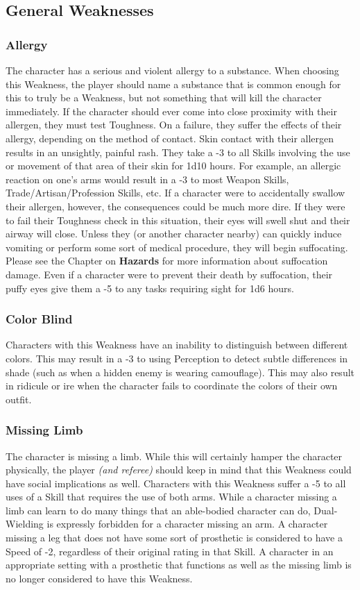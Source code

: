\documentclass[oneside]{book}
\begin{document}
\begin{multicols}{2}
\section{General Weaknesses}
\subsubsection{Allergy}
The character has a serious and violent allergy to a substance. When choosing this Weakness, the player should name a substance that is common enough for this to truly be a Weakness, but not something that will kill the character immediately. If the character should ever come into close proximity with their allergen, they must test Toughness. On a failure, they suffer the effects of their allergy, depending on the method of contact. Skin contact with their allergen results in an unsightly, painful rash. They take a -3 to all Skills involving the use or movement of that area of their skin for 1d10 hours. For example, an allergic reaction on one's arms would result in a -3 to most Weapon Skills, Trade/Artisan/Profession Skills, etc. If a character were to accidentally swallow their allergen, however, the consequences could be much more dire. If they were to fail their Toughness check in this situation, their eyes will swell shut and their airway will close. Unless they (or another character nearby) can quickly induce vomiting or perform some sort of medical procedure, they will begin suffocating. Please see the Chapter on \textbf{Hazards} for more information about suffocation damage. Even if a character were to prevent their death by suffocation, their puffy eyes give them a -5 to any tasks requiring sight for 1d6 hours.
\subsubsection{Color Blind}
Characters with this Weakness have an inability to distinguish between different colors. This may result in a -3 to using Perception to detect subtle differences in shade (such as when a hidden enemy is wearing camouflage). This may also result in ridicule or ire when the character fails to coordinate the colors of their own outfit. 
\subsubsection{Missing Limb}
The character is missing a limb. While this will certainly hamper the character physically, the player \emph{(and referee)} should keep in mind that this Weakness could have social implications as well. Characters with this Weakness suffer a -5 to all uses of a Skill that requires the use of both arms. While a character missing a limb can learn to do many things that an able-bodied character can do, Dual-Wielding is expressly forbidden for a character missing an arm. A character missing a leg that does not have some sort of prosthetic is considered to have a Speed of -2, regardless of their original rating in that Skill. A character in an appropriate setting with a prosthetic that functions as well as the missing limb is no longer considered to have this Weakness.

\end{multicols}
\end{document}
